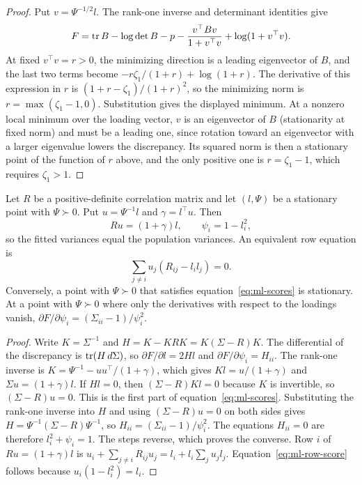 \begin{proof}
Put $v=\Psi^{-1/2}l$. The rank-one inverse and determinant identities give
\[
F=\operatorname{tr} B-\log\det B-p
-\frac{v^{\top}Bv}{1+v^{\top}v}+\log(1+v^{\top}v).
\]
At fixed $v^{\top}v=r>0$, the minimizing direction is a leading eigenvector of $B$, and the last two terms become $-r\zeta_1/(1+r)+\log(1+r)$. The derivative of this expression in $r$ is $(1+r-\zeta_1)/(1+r)^2$, so the minimizing norm is $r=\max(\zeta_1-1,0)$. Substitution gives the displayed minimum. At a nonzero local minimum over the loading vector, $v$ is an eigenvector of $B$ (stationarity at fixed norm) and must be a leading one, since rotation toward an eigenvector with a larger eigenvalue lowers the discrepancy. Its squared norm is then a stationary point of the function of $r$ above, and the only positive one is $r=\zeta_1-1$, which requires $\zeta_1>1$.
\end{proof}

\begin{applemma}
\label{lem:A-scores}
Let $R$ be a positive-definite correlation matrix and let $(l,\Psi)$ be a stationary point with $\Psi\succ0$. Put $u=\Psi^{-1}l$ and $\gamma=l^{\top}u$. Then
\begin{equation}
Ru=(1+\gamma)l,
\qquad \psi_i=1-l_i^2,
\label{eq:ml-scores}
\end{equation}
so the fitted variances equal the population variances. An equivalent row equation is
\begin{equation}
\sum_{j\ne i}u_j(R_{ij}-l_il_j)=0.
\label{eq:ml-row-score}
\end{equation}
Conversely, a point with $\Psi\succ0$ that satisfies equation~\eqref{eq:ml-scores} is stationary. At a point with $\Psi\succ0$ where only the derivatives with respect to the loadings vanish, $\partial F/\partial\psi_i=(\Sigma_{ii}-1)/\psi_i^2$.
\end{applemma}

\begin{proof}
Write $K=\Sigma^{-1}$ and $H=K-KRK=K(\Sigma-R)K$. The differential of the discrepancy is $\operatorname{tr}(H\,d\Sigma)$, so $\partial F/\partial l=2Hl$ and $\partial F/\partial\psi_i=H_{ii}$. The rank-one inverse is $K=\Psi^{-1}-uu^{\top}/(1+\gamma)$, which gives $Kl=u/(1+\gamma)$ and $\Sigma u=(1+\gamma)l$. If $Hl=0$, then $(\Sigma-R)Kl=0$ because $K$ is invertible, so $(\Sigma-R)u=0$. This is the first part of equation~\eqref{eq:ml-scores}. Substituting the rank-one inverse into $H$ and using $(\Sigma-R)u=0$ on both sides gives $H=\Psi^{-1}(\Sigma-R)\Psi^{-1}$, so $H_{ii}=(\Sigma_{ii}-1)/\psi_i^2$. The equations $H_{ii}=0$ are therefore $l_i^2+\psi_i=1$. The steps reverse, which proves the converse. Row $i$ of $Ru=(1+\gamma)l$ is $u_i+\sum_{j\ne i}R_{ij}u_j=l_i+l_i\sum_ju_jl_j$. Equation~\eqref{eq:ml-row-score} follows because $u_i(1-l_i^2)=l_i$.
\end{proof}

